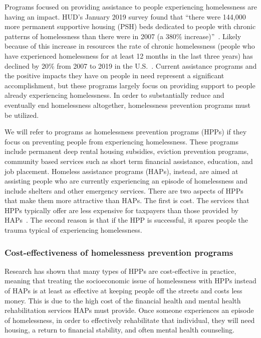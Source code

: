 \documentclass[10pt,letterpaper]{article}
\begin{document}
Programs focused on providing assistance to people experiencing homelessness are having an impact. HUD's January 2019 survey found that ``there were 144,000 more permanent supportive housing (PSH) beds dedicated to people with chronic patterns of homelessness than there were in 2007 (a 380\% increase)''~\cite{2019AHAR}. Likely because of this increase in resources the rate of chronic homelessness (people who have experienced homelessness for at least 12 months in the last three years) has declined by 20\% from 2007 to 2019 in the U.S.~\cite{2019AHAR}. Current assistance programs and the positive impacts they have on people in need represent a significant accomplishment, but these programs largely focus on providing support to people already experiencing homelessness. In order to substantially reduce and eventually end homelessness altogether, homelessness prevention programs must be utilized. 

We will refer to programs as homelessness prevention programs (HPPs) if they focus on preventing people from experiencing homelessness. These programs include permanent deep rental housing subsidies, eviction prevention programs, community based services such as short term financial assistance, education, and job placement. Homeless assistance programs (HAPs), instead, are aimed at assisting people who are currently experiencing an episode of homelessness and include shelters and other emergency services. There are two aspects of HPPs that make them more attractive than HAPs. The first is cost. The services that HPPs typically offer are less expensive for taxpayers than those provided by HAPs~\cite{shinn2019homelessness}. The second reason is that if the HPP is successful, it spares people the trauma typical of experiencing homelessness.

\subsubsection*{Cost-effectiveness of homelessness prevention programs}
Research has shown that many types of HPPs are cost-effective in practice, meaning that treating the socioeconomic issue of homelessness with HPPs instead of HAPs is at least as effective at keeping people off the streets and costs less money. This is due to the high cost of the financial health and mental health rehabilitation services HAPs must provide. Once someone experiences an episode of homelessness, in order to effectively rehabilitate that individual, they will need housing, a return to financial stability, and often mental health counseling.
\end{document}
